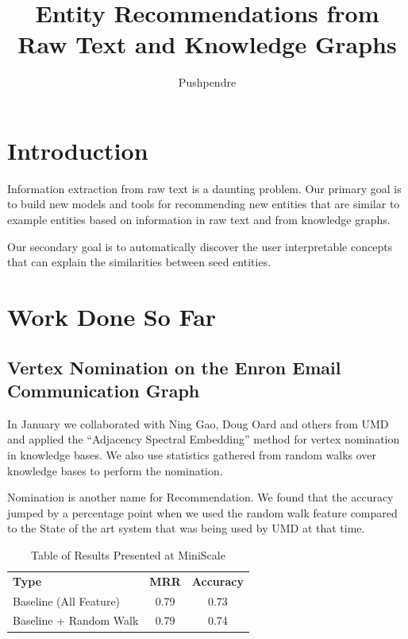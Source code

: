 \documentclass{article}
\title{Entity Recommendations from Raw Text and Knowledge Graphs}
\author{Pushpendre}
\begin{document}
\maketitle
\begin{abstract}

\end{abstract}
\section{Introduction}
\label{sec:introduction}
Information extraction from raw text is a daunting problem. Our primary goal is
to build new models and tools for recommending new entities that are similar to
example entities based on information in raw text and from knowledge graphs.

Our secondary goal is to automatically discover the user interpretable concepts
that can explain the similarities between seed entities.

\section{Work Done So Far}
\label{sec:work-done}
\subsection{Vertex Nomination on the Enron Email Communication Graph}
\label{sec:vert-nomin-enron}
In January we collaborated with Ning Gao, Doug Oard and others from UMD and
applied the ``Adjacency Spectral Embedding'' method for vertex nomination
in knowledge bases. We also use statistics gathered from random walks over
knowledge bases to perform the nomination.

Nomination is another name for Recommendation. We found that the accuracy jumped
by a percentage point when we used the random walk feature compared to the State
of the art system that was being used by UMD at that time.

\begin{table}[htbp]
  \centering
  \begin{tabular}{l c c}\toprule
    \textbf{Type} & \textbf{MRR} & \textbf{Accuracy}\\
    Baseline (All Feature) & 0.79 & 0.73 \\
    Baseline + Random Walk & 0.79 & 0.74 \\
    \bottomrule\end{tabular}
  \caption{Table of Results Presented at MiniScale}
  \label{tab:miniscale}
\end{table}
\end{document}
